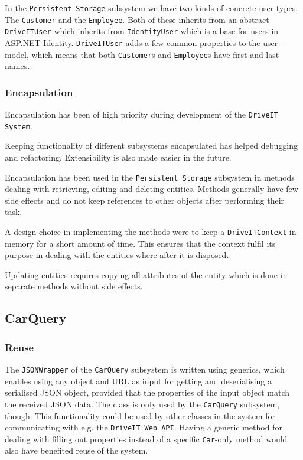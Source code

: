 In the \texttt{Persistent Storage} subsystem we have two kinds of concrete user types. The \texttt{Customer} and the \texttt{Employee}. Both of these inherits from an abstract \texttt{DriveITUser} which inherits from \texttt{IdentityUser} which is a base for users in ASP.NET Identity. \texttt{DriveITUser} adds a few common properties to the user-model, which means that both \texttt{Customer}s and \texttt{Employee}s have first and last names.

\subsubsection{Encapsulation}
Encapsulation has been of high priority during development of the \texttt{DriveIT System}. 

Keeping functionality of different subsystems encapsulated has helped debugging and refactoring. Extensibility is also made easier in the future.

Encapsulation has been used in the \texttt{Persistent Storage} subsystem in methods dealing with retrieving, editing and deleting entities. Methods generally have few side effects and do not keep references to other objects after performing their task.

A design choice in implementing the methods were to keep a \texttt{DriveITContext} in memory for a short amount of time. This ensures that the context fulfil its purpose in dealing with the entities where after it is disposed.

Updating entities requires copying all attributes of the entity which is done in separate methods without side effects.

\subsection{CarQuery}

\subsubsection{Reuse}
The \texttt{JSONWrapper} of the \texttt{CarQuery} subsystem is written using generics, which enables using any object and URL as input for getting and deserialising a serialised JSON object, provided that the properties of the input object match the received JSON data.
The class is only used by the \texttt{CarQuery} subsystem, though. This functionality could be used by other classes in the system for communicating with e.g. the \texttt{DriveIT Web API}.
Having a generic method for dealing with filling out properties instead of a specific \texttt{Car}-only method would also have benefited reuse of the system.

